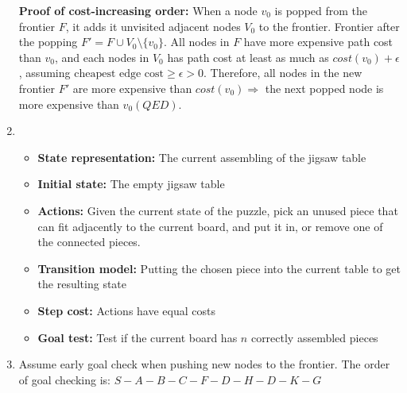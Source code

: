\documentclass{article}
\begin{document}
\begin{enumerate}[leftmargin=\labelsep]
    \textbf{Proof of cost-increasing order:} When a node $v_0$ is popped from the frontier $F$, it adds it unvisited adjacent nodes $V_0$ to the frontier. Frontier after the popping $F'= F \cup V_0 \setminus \{v_0\}$. All nodes in $F$ have more expensive path cost than $v_0$, and each nodes in $V_0$ has path cost at least as much as $cost(v_0) + \epsilon$, assuming $\text{cheapest edge cost} \ge \epsilon > 0$. Therefore, all nodes in the new frontier $F'$ are more expensive than $cost(v_0) \Rightarrow$ the next popped node is more expensive than $v_0 (QED)$. 
  \item 
  \begin{itemize}
    \item \textbf{State representation:} The current assembling of the jigsaw table
    \item \textbf{Initial state:} The empty jigsaw table
    \item \textbf{Actions:} Given the current state of the puzzle, pick an unused piece that can fit adjacently to the current board, and put it in, or remove one of the connected pieces.
    \item \textbf{Transition model:} Putting the chosen piece into the current table to get the resulting state
    \item \textbf{Step cost:} Actions have equal costs
    \item \textbf{Goal test:} Test if the current board has $n$ correctly assembled pieces
  \end{itemize}
  \item Assume early goal check when pushing new nodes to the frontier. The order of goal checking is: $S-A-B-C-F-D-H-D-K-G$
\end{enumerate}
\end{document}
